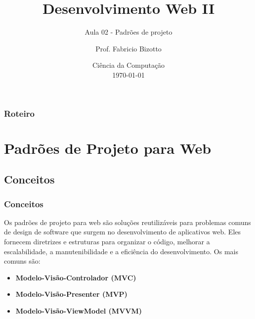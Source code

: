 \documentclass[
	10pt, %
	t, %
]{beamer}
\title[DesWebII]{Desenvolvimento Web II} %
\subtitle{Aula 02 - Padrões de projeto} %
\author[Fabricio Bizotto]{Prof. Fabricio Bizotto} %
\institute[IFC]{Instituto Federal Catarinense \\ \smallskip \textit{fabricio.bizotto@ifc.edu.br}} %
\date[\today]{Ciência da Computação \\ \today} %
\begin{document}

\begin{frame}
	\titlepage %
\end{frame}


\begin{frame}
	\frametitle{Roteiro} %
	
	\tableofcontents %
\end{frame}


\section{Padrões de Projeto para Web} %


\subsection{Conceitos}

\begin{frame}
	\frametitle{Conceitos}
	
	Os \alert{padrões de projeto para web} são soluções reutilizáveis para problemas comuns de design de software que surgem no desenvolvimento de aplicativos web. Eles fornecem \alert{diretrizes e estruturas} para organizar o código, melhorar a escalabilidade, a manutenibilidade e a eficiência do desenvolvimento. Os mais comuns são:

	\begin{itemize}
		\item \textbf{Modelo-Visão-Controlador (MVC)}
		\item \textbf{Modelo-Visão-Presenter (MVP)}
		\item \textbf{Modelo-Visão-ViewModel (MVVM)}
	\end{itemize}
\end{frame}
\end{document}
